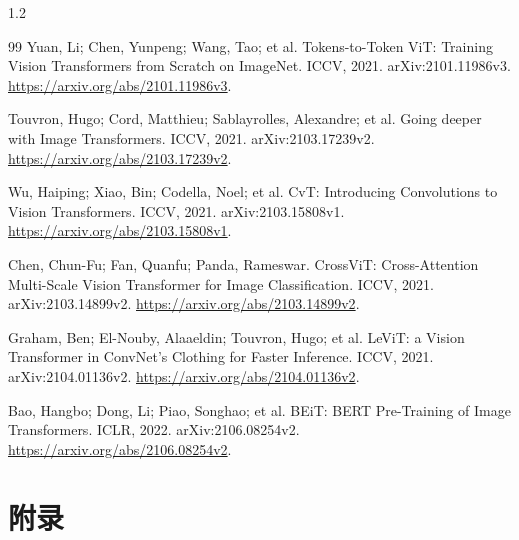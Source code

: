 \documentclass[UTF8,a4paper,zihao=-4,fontset=fandol]{ctexart}
\begin{document}
\begin{spacing}{1.2}
\begin{thebibliography}{99}
 Yuan, Li; Chen, Yunpeng; Wang, Tao; et al. Tokens-to-Token ViT: Training Vision Transformers from Scratch on ImageNet. ICCV, 2021. arXiv:2101.11986v3. \url{https://arxiv.org/abs/2101.11986v3}.

 Touvron, Hugo; Cord, Matthieu; Sablayrolles, Alexandre; et al. Going deeper with Image Transformers. ICCV, 2021. arXiv:2103.17239v2. \url{https://arxiv.org/abs/2103.17239v2}.

 Wu, Haiping; Xiao, Bin; Codella, Noel; et al. CvT: Introducing Convolutions to Vision Transformers. ICCV, 2021. arXiv:2103.15808v1. \url{https://arxiv.org/abs/2103.15808v1}.

 Chen, Chun-Fu; Fan, Quanfu; Panda, Rameswar. CrossViT: Cross-Attention Multi-Scale Vision Transformer for Image Classification. ICCV, 2021. arXiv:2103.14899v2. \url{https://arxiv.org/abs/2103.14899v2}.

 Graham, Ben; El-Nouby, Alaaeldin; Touvron, Hugo; et al. LeViT: a Vision Transformer in ConvNet's Clothing for Faster Inference. ICCV, 2021. arXiv:2104.01136v2. \url{https://arxiv.org/abs/2104.01136v2}.

 Bao, Hangbo; Dong, Li; Piao, Songhao; et al. BEiT: BERT Pre-Training of Image Transformers. ICLR, 2022. arXiv:2106.08254v2. \url{https://arxiv.org/abs/2106.08254v2}.
\end{thebibliography}\end{spacing}

\clearpage\section{附录}
\end{document}
